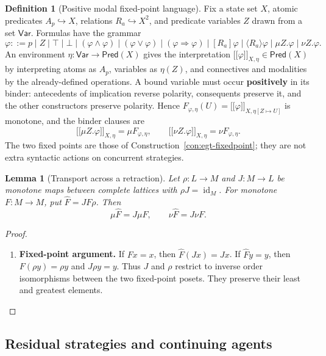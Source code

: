\documentclass[11pt,a4paper]{article}
\numberwithin{equation}{section}
\newtheorem{lemma}[theorem]{Lemma}
\theoremstyle{definition}
\newtheorem{definition}[theorem]{Definition}
\theoremstyle{remark}
\theoremstyle{plain}
\providecommand{\llbracket}{\mathopen{[\![}}
\providecommand{\rrbracket}{\mathclose{]\!]}}
\begin{document}
\begin{definition}[Positive modal fixed-point language]
\label{def:egt-positive-modal-fixed-point-language}
Fix a state set $X$, atomic predicates $A_p\hookrightarrow X$,
relations $R_a\hookrightarrow X^2$, and predicate variables $Z$ drawn
from a set $\mathsf{Var}$. Formulas have the grammar
\[
 \varphi::=p\mid Z\mid\top\mid\bot\mid
 (\varphi\wedge\varphi)\mid(\varphi\vee\varphi)\mid
 (\varphi\Rightarrow\varphi)\mid[R_a]\varphi\mid
 \langle R_a\rangle\varphi\mid\mu Z.\varphi\mid\nu Z.\varphi.
\]
An environment $\eta:\mathsf{Var}\to\mathsf{Pred}(X)$ gives the
interpretation $\llbracket\varphi\rrbracket_{X,\eta}\in\mathsf{Pred}(X)$
by interpreting atoms as $A_p$, variables as $\eta(Z)$, and connectives
and modalities by the already-defined operations. A bound variable must
occur \textbf{positively} in its binder: antecedents of implication
reverse polarity, consequents preserve it, and the other constructors
preserve polarity. Hence
$F_{\varphi,\eta}(U)=\llbracket\varphi\rrbracket_{X,\eta[Z\mapsto U]}$
is monotone, and the binder clauses are
\[
 \llbracket\mu Z.\varphi\rrbracket_{X,\eta}=\mu F_{\varphi,\eta},
 \qquad
 \llbracket\nu Z.\varphi\rrbracket_{X,\eta}=\nu F_{\varphi,\eta}.
\]
The two fixed points are those of
Construction~\ref{con:egt-fixedpoint}; they are not extra syntactic
actions on concurrent strategies.
\end{definition}
\begin{lemma}[Transport across a retraction]
\label{lem:egt-retraction-fixedpoints}
Let $\rho:L\to M$ and $J:M\to L$ be monotone maps between complete lattices
with $\rho J=\operatorname{id}_M$. For monotone $F:M\to M$, put
$\widehat F=JF\rho$. Then
\[
 \mu\widehat F=J\mu F,\qquad\nu\widehat F=J\nu F.
\]
\end{lemma}
\begin{proof}
\leavevmode
\begin{enumerate}[label=\textup{(\arabic*)},leftmargin=*,itemsep=4pt,topsep=3pt]
  \item \textbf{Fixed-point argument.} If $Fx=x$, then $\widehat F(Jx)=Jx$. If $\widehat Fy=y$, then
$F(\rho y)=\rho y$ and $J\rho y=y$. Thus $J$ and $\rho$ restrict to
inverse order isomorphisms between the two fixed-point posets. They preserve
their least and greatest elements.
\end{enumerate}
\end{proof}

\subsection{Residual strategies and continuing agents}
\label{sec:egt-continuation}
\end{document}
